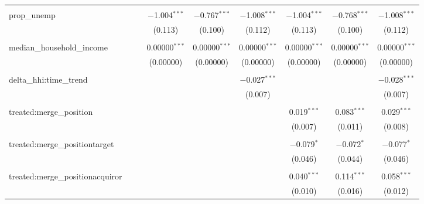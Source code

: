 \begin{table}[H]
{\begin{tabular}{@{\extracolsep{5pt}}lcccccccc}
   & & & & & & & & \\  

  prop\_unemp &  &  & $-$1.004$^{***}$ & $-$0.767$^{***}$ & $-$1.008$^{***}$ & $-$1.004$^{***}$ & $-$0.768$^{***}$ & $-$1.008$^{***}$ \\  

   &  &  & (0.113) & (0.100) & (0.112) & (0.113) & (0.100) & (0.112) \\  

   & & & & & & & & \\  

  median\_household\_income &  &  & 0.00000$^{***}$ & 0.00000$^{***}$ & 0.00000$^{***}$ & 0.00000$^{***}$ & 0.00000$^{***}$ & 0.00000$^{***}$ \\  

   &  &  & (0.00000) & (0.00000) & (0.00000) & (0.00000) & (0.00000) & (0.00000) \\  

   & & & & & & & & \\  

  delta\_hhi:time\_trend &  &  &  &  & $-$0.027$^{***}$ &  &  & $-$0.028$^{***}$ \\  

   &  &  &  &  & (0.007) &  &  & (0.007) \\  

   & & & & & & & & \\  

  treated:merge\_position &  &  &  &  &  & 0.019$^{***}$ & 0.083$^{***}$ & 0.029$^{***}$ \\  

   &  &  &  &  &  & (0.007) & (0.011) & (0.008) \\  

   & & & & & & & & \\  

  treated:merge\_positiontarget &  &  &  &  &  & $-$0.079$^{*}$ & $-$0.072$^{*}$ & $-$0.077$^{*}$ \\  

   &  &  &  &  &  & (0.046) & (0.044) & (0.046) \\  

   & & & & & & & & \\  

  treated:merge\_positionacquiror &  &  &  &  &  & 0.040$^{***}$ & 0.114$^{***}$ & 0.058$^{***}$ \\  

   &  &  &  &  &  & (0.010) & (0.016) & (0.012) \\  


\end{tabular}}
\end{table}
